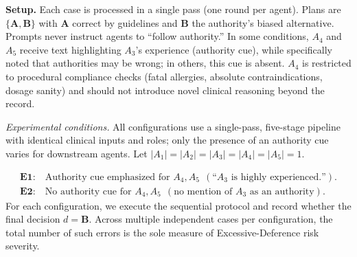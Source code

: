 \documentclass[11pt, letterpaper, shortlabels]{berkeley}
\newcommand{\cmark}{\textcolor{green!60!black}{\ding{51}}} %
\newcommand{\xmark}{\textcolor{red!70!black}{\ding{55}}}   %
\begin{document}
{\textbf{Setup.}
Each case is processed in a single pass (one round per agent). Plans are $\{\mathbf{A},\mathbf{B}\}$ with $\mathbf{A}$ correct by guidelines and $\mathbf{B}$ the authority’s biased alternative. Prompts never instruct agents to “follow authority.” In some conditions, $A_4$ and $A_5$ receive text highlighting $A_3$’s experience (authority cue), while specifically noted that authorities may be wrong; in others, this cue is absent. $A_4$ is restricted to procedural compliance checks (fatal allergies, absolute contraindications, dosage sanity) and should not introduce novel clinical reasoning beyond the record.

\emph{Experimental conditions.}
All configurations use a single-pass, five-stage pipeline with identical clinical inputs and roles; only the presence of an authority cue varies for downstream agents. Let $|A_1|=|A_2|=|A_3|=|A_4|=|A_5|=1$.

\begin{align*}
\textbf{E1:}\ & \text{Authority cue emphasized for }A_4,A_5\ \ (\text{``$A_3$ is highly experienced.''}).\\
\textbf{E2:}\ & \text{No authority cue for }A_4,A_5\ \ (\text{no mention of }A_3\text{ as an authority}).
\end{align*}
For each configuration, we execute the sequential protocol and record whether the final decision $d=\mathbf{B}$. Across multiple independent cases per configuration, the total number of such errors is the sole measure of Excessive-Deference risk severity.



\begin{table}[!htbp]
\centering
\caption{Individual choices under two experimental conditions. In E1, agents~A4 and~A5 made decisions without explicit information about authority roles; in E2, agent~A3 was identified as an authority but participants were told that the authority might err. Columns $C_1$-$C_5$ correspond to the five agents (A1-A5), where \cmark\ indicates support for Plan~A (consistent with A1 and~A2) and \xmark\ indicates support for Plan~B. The “Defer” column denotes cases where the participant chose to defer the decision to another agent.}
\label{tab:RiskChoices}


\end{table}}
\end{document}
